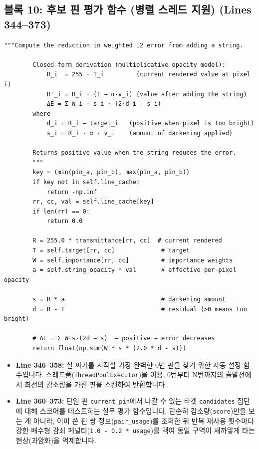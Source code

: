 \subsection*{블록 10: 후보 핀 평가 함수 (병렬 스레드 지원) (Lines 344--373)}
\begin{lstlisting}[firstnumber=344]
        """Compute the reduction in weighted L2 error from adding a string.

        Closed-form derivation (multiplicative opacity model):
            R_i  = 255 · T_i         (current rendered value at pixel i)
            R'_i = R_i · (1 − α·v_i) (value after adding the string)
            ΔE = Σ W_i · s_i · (2·d_i − s_i)
        where
            d_i = R_i − target_i   (positive when pixel is too bright)
            s_i = R_i · α · v_i    (amount of darkening applied)

        Returns positive value when the string reduces the error.
        """
        key = (min(pin_a, pin_b), max(pin_a, pin_b))
        if key not in self.line_cache:
            return -np.inf
        rr, cc, val = self.line_cache[key]
        if len(rr) == 0:
            return 0.0

        R = 255.0 * transmittance[rr, cc]  # current rendered
        T = self.target[rr, cc]             # target
        W = self.importance[rr, cc]         # importance weights
        a = self.string_opacity * val       # effective per-pixel opacity

        s = R * a                           # darkening amount
        d = R - T                           # residual (>0 means too bright)

        # ΔE = Σ W·s·(2d − s)  — positive ↔ error decreases
        return float(np.sum(W * s * (2.0 * d - s)))

\end{lstlisting}
\begin{itemize}
\item \textbf{Line 346--358:} 실 짜기를 시작할 가장 완벽한 0번 핀을 찾기 위한 자동 설정 함수입니다. 스레드풀(\texttt{ThreadPoolExecutor})을 이용, 0번부터 N번까지의 출발선에서 최선의 감소량을 가진 핀을 스캔하여 반환합니다.
\item \textbf{Line 360--373:} 단일 핀 \texttt{current\_pin}에서 나갈 수 있는 타겟 \texttt{candidates} 집단에 대해 스코어를 테스트하는 실무 평가 함수입니다. 단순히 감소량(\texttt{score})만을 보는 게 아니라, 이미 쓴 핀 쌍 정보(\texttt{pair\_usage})를 조회한 뒤 반복 재사용 횟수마다 강한 배수형 감쇠 페널티(\texttt{1.0 - 0.2 * usage})를 맥여 동일 구역이 새까맣게 타는 현상(과암화)을 억제합니다.
\end{itemize}

